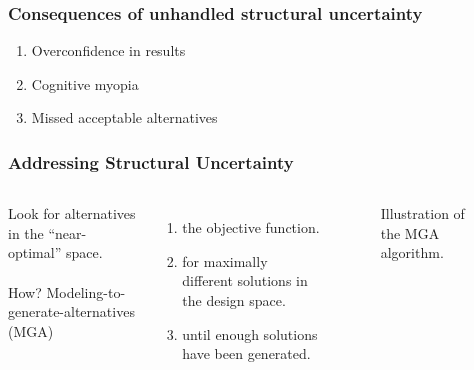 \begin{frame}
    \frametitle{Consequences of unhandled structural uncertainty}

    \begin{enumerate}
        \item Overconfidence in results
        \item Cognitive myopia
        \item Missed acceptable alternatives
    \end{enumerate}

\end{frame}

\begin{frame}
    \frametitle{Addressing Structural Uncertainty}

    \begin{columns}
        \column[t]{4cm}
         Look for alternatives in the ``near-optimal'' space.\\~\\

        How? Modeling-to-generate-alternatives (MGA)
        \begin{enumerate}
            \item {} the objective function.
            \item {} for maximally different solutions in the design space.
            \item {} until enough solutions have been generated.
        \end{enumerate}
    
        \column[t]{6cm}
        \begin{figure}
            \centering
            \resizebox{\columnwidth}{!}{}
            \caption{Illustration of the MGA algorithm.}
            \label{fig:standard-mga}
        \end{figure}
    \end{columns}

\end{frame}